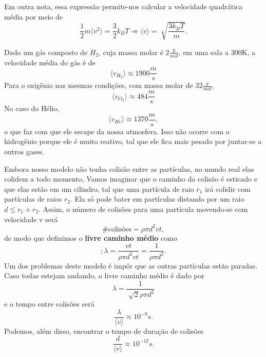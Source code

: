 \documentclass[phsyicsII_notes.tex]{subfiles}
\begin{document}
Em outra nota, essa expressão permite-nos calcular a velocidade quadrática média por meio de
\[
	\frac{1}{2}m \langle v^{2} \rangle = \frac{3}{2}k_{B}T \Rightarrow \langle v \rangle = \sqrt[]{\frac{3k_{B}T}{m}}.
\]
\begin{example}
	Dado um gás composto de \(H_{2}\), cuja massa molar é \(2\frac{g}{mol}\), em uma sala a 300K, a velocidade média do gás é de
	\[
		\langle v_{H_{2}} \rangle\approx 1900\frac{m}{s}
	\]
	Para o oxigênio nas mesmas condições, com massa molar de \(32 \frac{g}{mol}\),
	\[
		\langle v_{O_{2}} \rangle\approx 484 \frac{m}{s}
	\]
	No caso do Hélio,
	\[
		\langle v_{He} \rangle\approx 1370 \frac{m}{s},
	\]
	o que faz com que ele escape da nossa atmosfera. Isso não ocorre com o hidrogênio porque ele é muito reativo,
	tal que ele fica mais pesado por juntar-se a outros gases.
\end{example}
Embora nosso modelo não tenha colisão entre as partículas, no mundo real elas colidem a todo momento, Vamos imaginar
que o caminho da colisão é esticado e que elas estão em um cilindro, tal que uma partícula de raio \(r_{1}\) irá colidir com partículas de raios \(r_{2}\).
Ela só pode bater em partículas distando por um raio \(d\leq r_{1} + r_{2}\). Assim, o número de colisões para uma
partícula movendo-se com velocidade v será
\[
	\#\text{colisões} = \rho \pi d^{2}vt,
\]
de modo que definimos o \textbf{livre caminho médio} como
\[
	;\lambda = \frac{vt}{\rho \pi d^{2}vt} = \frac{1}{\rho \pi d^{2}}.
\]
Um dos problemas deste modelo é impôr que as outras partículas estão paradas. Caso todas estejam andando, o livre
caminho médio é dado por
\[
	\lambda = \frac{1}{\sqrt[]{2}\rho \pi d^{2}}
\]
e o tempo entre colisões será
\[
	\frac{\lambda }{\langle v \rangle}\approx 10^{-9}s.
\]
Podemos, além disso, encontrar o tempo de duração de colisões
\[
	\frac{d}{\langle v \rangle}\approx 10^{-12}s.
\]
\end{document}
